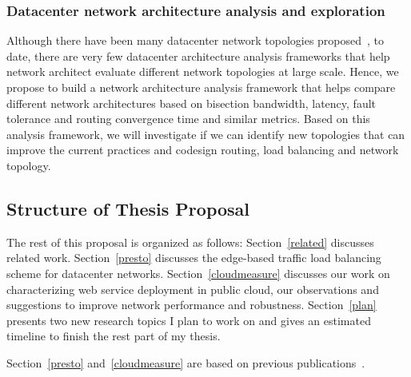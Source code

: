 \iffalse
Our goal is not limited to just keeping switch buffers low in the network 
such that we can achieve low latency for the whole data center network. 
As pointed out by~\cite{judd2015dctcp}, when TCP traffic is mixed with DCTCP traffic and ECN marking 
is turned on, there are two practical performance issues: 1)DCTCP can gain almost all 
the bandwidth while TCP can only get very little share and 2)TCP or DCTCP's connection 
establishment probability is decreased sharply with the increase of the number of 
competing flows in the network. All these two issues are related to the switch's 
AQM (Active Queue Management) scheme---it simply drops non-ECT (ECN-Capable Transport) 
packets when the switch's queue length is (even slightly) larger than the threshold. 
One of the solutions is to apply ECT to all packets at the virtualization edge 
(no matter it is TCP CUBIC or DCTCP, no matter it is control packets or data packets). 
We undo the ECT marking properly when the packet arrives the destination host. 
Finally, we also hope that our congestion control enforcement 
logic is beneficial to the lossness \emph{ Data Center Bridging } or \emph{ Converged Ethernet } 
environment where there are serious bufferbloat (hence increase network latency) and 
fairness issues~\cite{tcp-bolt,zhu2015rdma}.
\fi

\subsubsection{Datacenter network architecture analysis and exploration}
Although there have been many datacenter network topologies 
proposed~\cite{fattree,niranjan2009portland,vl2,singh2015jupiter}, 
to date, there are very few datacenter architecture analysis frameworks 
that help network architect evaluate different network topologies 
at large scale. Hence, we propose to  build a network architecture analysis 
framework that helps compare different network architectures based on bisection 
bandwidth, latency, fault tolerance and routing convergence time and similar metrics. 
Based on this analysis framework, we will investigate if we can identify new topologies 
that can improve the current practices and codesign routing, load balancing and network topology.

\subsection{Structure of Thesis Proposal}
\label{outline}
The rest of this proposal is organized as follows: Section~\ref{related} discusses related work.
Section~\ref{presto} discusses the edge-based traffic load balancing scheme for datacenter networks. 
Section~\ref{cloudmeasure} discusses our work 
on characterizing web service deployment in public cloud, our observations and 
suggestions to improve network performance and robustness. 
Section~\ref{plan} presents two new research topics I plan to work on and 
gives an estimated timeline to finish the rest part of my thesis.

Section~\ref{presto} and~\ref{cloudmeasure} are based on previous publications~\cite{he2015presto,he2013next}.
